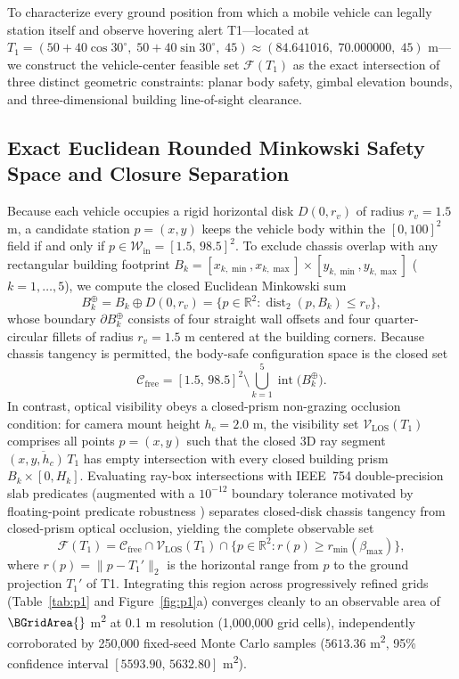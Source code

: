 To characterize every ground position from which a mobile vehicle can legally station itself and observe hovering alert T1—located at $T_1=(50+40\cos 30^\circ,\; 50+40\sin 30^\circ,\; 45)\approx(84.641016,\; 70.000000,\; 45)$ m—we construct the vehicle-center feasible set $\mathcal{F}(T_1)$ as the exact intersection of three distinct geometric constraints: planar body safety, gimbal elevation bounds, and three-dimensional building line-of-sight clearance.

\subsection{Exact Euclidean Rounded Minkowski Safety Space and Closure Separation}
Because each vehicle occupies a rigid horizontal disk $D(0,r_v)$ of radius $r_v=1.5$ m, a candidate station $p=(x,y)$ keeps the vehicle body within the $[0,100]^2$ field if and only if $p\in\mathcal{W}_{\mathrm{in}}=[1.5,\,98.5]^2$. To exclude chassis overlap with any rectangular building footprint $B_k=[x_{k,\min},x_{k,\max}]\times[y_{k,\min},y_{k,\max}]$ ($k=1,\dots,5$), we compute the closed Euclidean Minkowski sum \cite{lozano1983}
\[
B_k^{\oplus} = B_k \oplus D(0,r_v) = \bigl\{p\in\mathbb{R}^2 : \operatorname{dist}_2(p,B_k) \le r_v\bigr\},
\]
whose boundary $\partial B_k^{\oplus}$ consists of four straight wall offsets and four quarter-circular fillets of radius $r_v=1.5$ m centered at the building corners. Because chassis tangency is permitted, the body-safe configuration space is the closed set
\[
\mathcal{C}_{\mathrm{free}} = [1.5,\,98.5]^2 \setminus \bigcup_{k=1}^{5} \operatorname{int}\!\bigl(B_k^{\oplus}\bigr).
\]
In contrast, optical visibility obeys a closed-prism non-grazing occlusion condition: for camera mount height $h_c=2.0$ m, the visibility set $\mathcal{V}_{\mathrm{LOS}}(T_1)$ comprises all points $p=(x,y)$ such that the closed 3D ray segment $\overline{(x,y,h_c)\,T_1}$ has empty intersection with every closed building prism $B_k\times[0,H_k]$. Evaluating ray-box intersections with IEEE~754 double-precision slab predicates (augmented with a $10^{-12}$ boundary tolerance motivated by floating-point predicate robustness \cite{shewchuk1997}) separates closed-disk chassis tangency from closed-prism optical occlusion, yielding the complete observable set
\[
\mathcal{F}(T_1) = \mathcal{C}_{\mathrm{free}} \cap \mathcal{V}_{\mathrm{LOS}}(T_1) \cap \bigl\{p\in\mathbb{R}^2 : r(p) \ge r_{\min}(\beta_{\max})\bigr\},
\]
where $r(p)=\|p-T_1'\|_2$ is the horizontal range from $p$ to the ground projection $T_1'$ of T1. Integrating this region across progressively refined grids (Table~\ref{tab:p1} and Figure~\ref{fig:p1}a) converges cleanly to an observable area of $\BGridArea{}$ m\textsuperscript{2} at 0.1 m resolution (1,000,000 grid cells), independently corroborated by 250,000 fixed-seed Monte Carlo samples ($5613.36$ m\textsuperscript{2}, 95\% confidence interval $[5593.90,\,5632.80]$ m\textsuperscript{2}).

